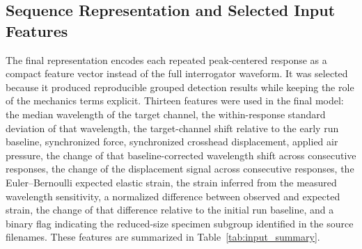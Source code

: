 \documentclass[notspecified,article,submit,pdftex,moreauthors]{Definitions/mdpi}
\begin{document}
\subsection{Sequence Representation and Selected Input Features}

The final representation encodes each repeated peak-centered response as a compact feature vector instead of the full interrogator waveform. It was selected because it produced reproducible grouped detection results while keeping the role of the mechanics terms explicit. Thirteen features were used in the final model: the median wavelength of the target channel, the within-response standard deviation of that wavelength, the target-channel shift relative to the early run baseline, synchronized force, synchronized crosshead displacement, applied air pressure, the change of that baseline-corrected wavelength shift across consecutive responses, the change of the displacement signal across consecutive responses, the Euler--Bernoulli expected elastic strain, the strain inferred from the measured wavelength sensitivity, a normalized difference between observed and expected strain, the change of that difference relative to the initial run baseline, and a binary flag indicating the reduced-size specimen subgroup identified in the source filenames. These features are summarized in Table~\ref{tab:input_summary}.
\end{document}
